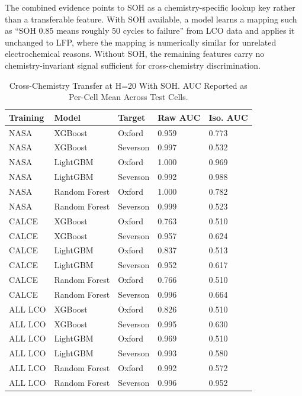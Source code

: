 \documentclass[journal]{IEEEtran}
\begin{document}
The combined evidence points to SOH as a chemistry-specific lookup key rather than a transferable feature. With SOH available, a model learns a mapping such as ``SOH 0.85 means roughly 50 cycles to failure'' from LCO data and applies it unchanged to LFP, where the mapping is numerically similar for unrelated electrochemical reasons. Without SOH, the remaining features carry no chemistry-invariant signal sufficient for cross-chemistry discrimination.

\begin{table}[t]
\caption{Cross-Chemistry Transfer at H=20 With SOH. AUC Reported as Per-Cell Mean Across Test Cells.}
\label{tab:crosswith}
\centering
\begin{tabular}{lllll}
\toprule
\textbf{Training} & \textbf{Model} & \textbf{Target} & \textbf{Raw AUC} & \textbf{Iso. AUC}\\
\midrule
NASA & XGBoost & Oxford & 0.959 & 0.773\\
NASA & XGBoost & Severson & 0.997 & 0.532\\
NASA & LightGBM & Oxford & 1.000 & 0.969\\
NASA & LightGBM & Severson & 0.992 & 0.988\\
NASA & Random Forest & Oxford & 1.000 & 0.782\\
NASA & Random Forest & Severson & 0.999 & 0.523\\
CALCE & XGBoost & Oxford & 0.763 & 0.510\\
CALCE & XGBoost & Severson & 0.957 & 0.624\\
CALCE & LightGBM & Oxford & 0.837 & 0.513\\
CALCE & LightGBM & Severson & 0.952 & 0.617\\
CALCE & Random Forest & Oxford & 0.766 & 0.510\\
CALCE & Random Forest & Severson & 0.996 & 0.664\\
ALL LCO & XGBoost & Oxford & 0.826 & 0.510\\
ALL LCO & XGBoost & Severson & 0.995 & 0.630\\
ALL LCO & LightGBM & Oxford & 0.969 & 0.510\\
ALL LCO & LightGBM & Severson & 0.993 & 0.580\\
ALL LCO & Random Forest & Oxford & 0.992 & 0.572\\
ALL LCO & Random Forest & Severson & 0.996 & 0.952\\
\bottomrule
\end{tabular}
\end{table}
\end{document}
